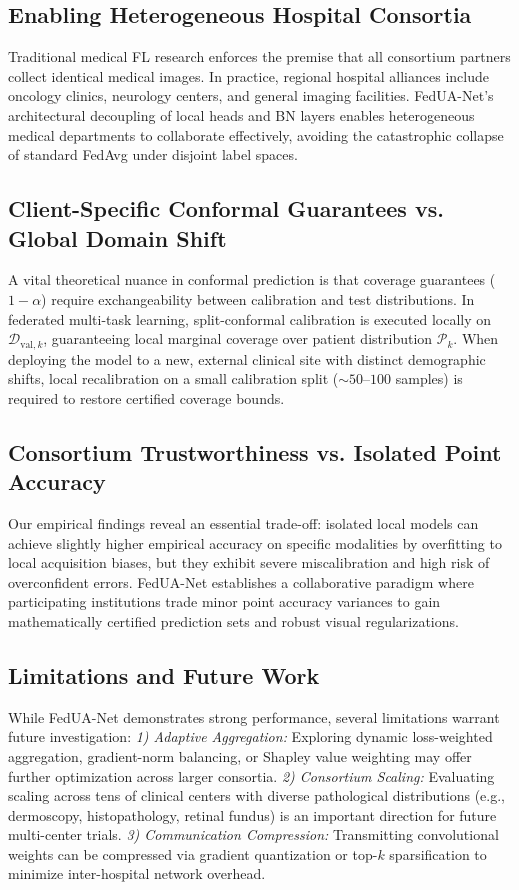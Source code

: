 \documentclass[journal]{IEEEtran}
\begin{document}
\subsection{Enabling Heterogeneous Hospital Consortia}
Traditional medical FL research enforces the premise that all consortium partners collect identical medical images. In practice, regional hospital alliances include oncology clinics, neurology centers, and general imaging facilities. FedUA-Net's architectural decoupling of local heads and BN layers enables heterogeneous medical departments to collaborate effectively, avoiding the catastrophic collapse of standard FedAvg under disjoint label spaces.

\subsection{Client-Specific Conformal Guarantees vs. Global Domain Shift}
A vital theoretical nuance in conformal prediction is that coverage guarantees ($1-\alpha$) require exchangeability between calibration and test distributions. In federated multi-task learning, split-conformal calibration is executed locally on $\mathcal{D}_{\text{val}, k}$, guaranteeing local marginal coverage over patient distribution $\mathcal{P}_k$. When deploying the model to a new, external clinical site with distinct demographic shifts, local recalibration on a small calibration split ($\sim 50\text{--}100$ samples) is required to restore certified coverage bounds.

\subsection{Consortium Trustworthiness vs. Isolated Point Accuracy}
Our empirical findings reveal an essential trade-off: isolated local models can achieve slightly higher empirical accuracy on specific modalities by overfitting to local acquisition biases, but they exhibit severe miscalibration and high risk of overconfident errors. FedUA-Net establishes a collaborative paradigm where participating institutions trade minor point accuracy variances to gain mathematically certified prediction sets and robust visual regularizations.

\subsection{Limitations and Future Work}
While FedUA-Net demonstrates strong performance, several limitations warrant future investigation:
\textit{1) Adaptive Aggregation:} Exploring dynamic loss-weighted aggregation, gradient-norm balancing, or Shapley value weighting may offer further optimization across larger consortia.
\textit{2) Consortium Scaling:} Evaluating scaling across tens of clinical centers with diverse pathological distributions (e.g., dermoscopy, histopathology, retinal fundus) is an important direction for future multi-center trials.
\textit{3) Communication Compression:} Transmitting convolutional weights can be compressed via gradient quantization or top-$k$ sparsification to minimize inter-hospital network overhead.
\end{document}
